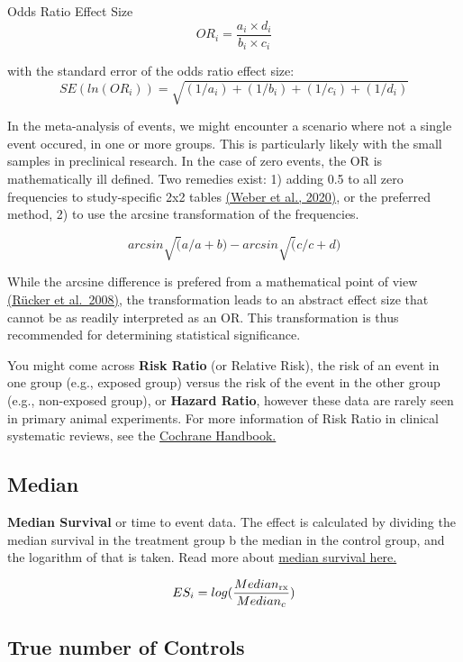 \documentclass[
]{book}
\begin{document}
Odds Ratio Effect Size
\[ OR_i = \frac {a_i \times d_i}{b_i \times c_i}  \]

with the standard error of the odds ratio effect size:
\[ SE(ln(OR_i)) = \sqrt{ (1/a_i)+(1/b_i)+(1/c_i)+(1/d_i) }   \]

In the meta-analysis of events, we might encounter a scenario where not a single event occured, in one or more groups. This is particularly likely with the small samples in preclinical research. In the case of zero events, the OR is mathematically ill defined. Two remedies exist:
1) adding 0.5 to all zero frequencies to study-specific 2x2 tables \href{https://onlinelibrary.wiley.com/doi/full/10.1002/jrsm.1460}{(Weber et al., 2020)},
or the preferred method, 2) to use the arcsine transformation of the frequencies.

\[ arcsin \sqrt (a/a+b) - arcsin \sqrt(c/c+d) \]

While the arcsine difference is prefered from a mathematical point of view \href{https://onlinelibrary.wiley.com/doi/abs/10.1002/sim.3511}{(Rücker et al.~2008)}, the transformation leads to an abstract effect size that cannot be as readily interpreted as an OR. This transformation is thus recommended for determining statistical significance.

You might come across \textbf{Risk Ratio} (or Relative Risk), the risk of an event in one group (e.g., exposed group) versus the risk of the event in the other group (e.g., non-exposed group), or \textbf{Hazard Ratio}, however these data are rarely seen in primary animal experiments. For more information of Risk Ratio in clinical systematic reviews, see the \href{https://handbook-5-1.cochrane.org/chapter_9/box_9_2_a_calculation_of_risk_ratio_rr_odds_ratio_or_and.htm}{Cochrane Handbook.}

\subsection{Median}\label{median}

\textbf{Median Survival} or time to event data. The effect is calculated by dividing the median survival in the treatment group b the median in the control group, and the logarithm of that is taken. Read more about \href{https://systematicreviewsjournal.biomedcentral.com/articles/10.1186/s13643-021-01824-0}{median survival here.}

\[ ES_i = log (\frac{Median_{\rm rx}}{Median_c} ) \]

\subsection{True number of Controls}\label{true-number-of-controls}
\end{document}
